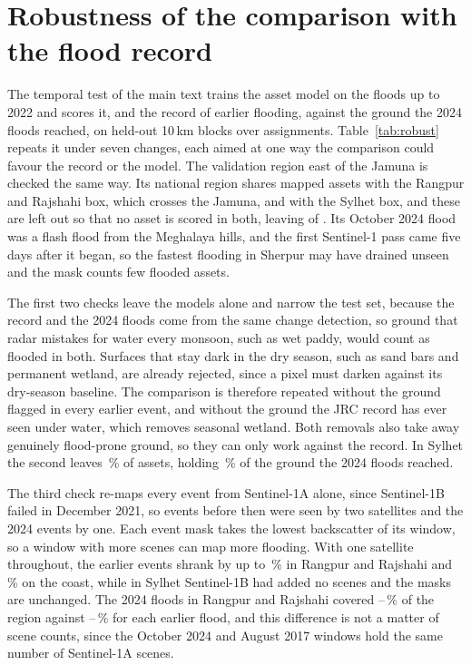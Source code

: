 \documentclass[11pt]{article}
\begin{document}
\section{Robustness of the comparison with the flood record}
\label{si:robust}

The temporal test of the main text trains the asset model on the floods up to 2022 and scores it, and the record of earlier flooding, against the ground the 2024 floods reached, on held-out 10\,km blocks over \RRBenchSeeds{} assignments. Table~\ref{tab:robust} repeats it under seven changes, each aimed at one way the comparison could favour the record or the model. The validation region east of the Jamuna is checked the same way. Its national region shares \JamunaSharedById{} mapped assets with the Rangpur and Rajshahi box, which crosses the Jamuna, and \JamunaSharedByLocation{} with the Sylhet box, and these are left out so that no asset is scored in both, leaving \JamunaIndAssets{} of \JamunaNationalAssets{}. Its October 2024 flood was a flash flood from the Meghalaya hills, and the first Sentinel-1 pass came five days after it began, so the fastest flooding in Sherpur may have drained unseen and the mask counts few flooded assets.

The first two checks leave the models alone and narrow the test set, because the record and the 2024 floods come from the same change detection, so ground that radar mistakes for water every monsoon, such as wet paddy, would count as flooded in both. Surfaces that stay dark in the dry season, such as sand bars and permanent wetland, are already rejected, since a pixel must darken against its dry-season baseline. The comparison is therefore repeated without the ground flagged in every earlier event, and without the ground the JRC record has ever seen under water, which removes seasonal wetland. Both removals also take away genuinely flood-prone ground, so they can only work against the record. In Sylhet the second leaves \SylhetPersistWaterAssetShare{}\,\% of assets, holding \SylhetPersistWaterPosShare{}\,\% of the ground the 2024 floods reached.

The third check re-maps every event from Sentinel-1A alone, since Sentinel-1B failed in December 2021, so events before then were seen by two satellites and the 2024 events by one. Each event mask takes the lowest backscatter of its window, so a window with more scenes can map more flooding. With one satellite throughout, the earlier events shrank by up to \RRSingleSatShrinkMax{}\,\% in Rangpur and Rajshahi and \CoastalSingleSatShrinkMax{}\,\% on the coast, while in Sylhet Sentinel-1B had added no scenes and the masks are unchanged. The 2024 floods in Rangpur and Rajshahi covered \RRLateExtentMin{}--\RRLateExtentMax{}\,\% of the region against \RREarlyExtentMin{}--\RREarlyExtentMax{}\,\% for each earlier flood, and this difference is not a matter of scene counts, since the October 2024 and August 2017 windows hold the same number of Sentinel-1A scenes.
\end{document}
